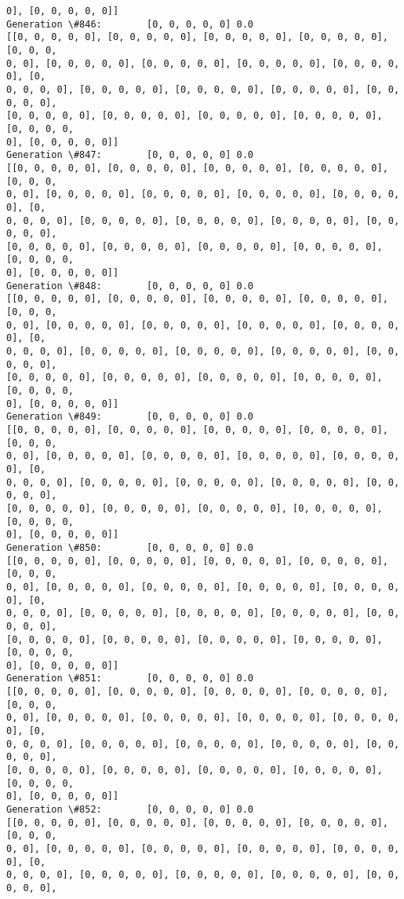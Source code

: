 \documentclass[11pt]{article}
\begin{document}
\begin{Verbatim}[commandchars=\\\{\}]
0], [0, 0, 0, 0, 0]]
Generation \#846:        [0, 0, 0, 0, 0] 0.0
[[0, 0, 0, 0, 0], [0, 0, 0, 0, 0], [0, 0, 0, 0, 0], [0, 0, 0, 0, 0], [0, 0, 0,
0, 0], [0, 0, 0, 0, 0], [0, 0, 0, 0, 0], [0, 0, 0, 0, 0], [0, 0, 0, 0, 0], [0,
0, 0, 0, 0], [0, 0, 0, 0, 0], [0, 0, 0, 0, 0], [0, 0, 0, 0, 0], [0, 0, 0, 0, 0],
[0, 0, 0, 0, 0], [0, 0, 0, 0, 0], [0, 0, 0, 0, 0], [0, 0, 0, 0, 0], [0, 0, 0, 0,
0], [0, 0, 0, 0, 0]]
Generation \#847:        [0, 0, 0, 0, 0] 0.0
[[0, 0, 0, 0, 0], [0, 0, 0, 0, 0], [0, 0, 0, 0, 0], [0, 0, 0, 0, 0], [0, 0, 0,
0, 0], [0, 0, 0, 0, 0], [0, 0, 0, 0, 0], [0, 0, 0, 0, 0], [0, 0, 0, 0, 0], [0,
0, 0, 0, 0], [0, 0, 0, 0, 0], [0, 0, 0, 0, 0], [0, 0, 0, 0, 0], [0, 0, 0, 0, 0],
[0, 0, 0, 0, 0], [0, 0, 0, 0, 0], [0, 0, 0, 0, 0], [0, 0, 0, 0, 0], [0, 0, 0, 0,
0], [0, 0, 0, 0, 0]]
Generation \#848:        [0, 0, 0, 0, 0] 0.0
[[0, 0, 0, 0, 0], [0, 0, 0, 0, 0], [0, 0, 0, 0, 0], [0, 0, 0, 0, 0], [0, 0, 0,
0, 0], [0, 0, 0, 0, 0], [0, 0, 0, 0, 0], [0, 0, 0, 0, 0], [0, 0, 0, 0, 0], [0,
0, 0, 0, 0], [0, 0, 0, 0, 0], [0, 0, 0, 0, 0], [0, 0, 0, 0, 0], [0, 0, 0, 0, 0],
[0, 0, 0, 0, 0], [0, 0, 0, 0, 0], [0, 0, 0, 0, 0], [0, 0, 0, 0, 0], [0, 0, 0, 0,
0], [0, 0, 0, 0, 0]]
Generation \#849:        [0, 0, 0, 0, 0] 0.0
[[0, 0, 0, 0, 0], [0, 0, 0, 0, 0], [0, 0, 0, 0, 0], [0, 0, 0, 0, 0], [0, 0, 0,
0, 0], [0, 0, 0, 0, 0], [0, 0, 0, 0, 0], [0, 0, 0, 0, 0], [0, 0, 0, 0, 0], [0,
0, 0, 0, 0], [0, 0, 0, 0, 0], [0, 0, 0, 0, 0], [0, 0, 0, 0, 0], [0, 0, 0, 0, 0],
[0, 0, 0, 0, 0], [0, 0, 0, 0, 0], [0, 0, 0, 0, 0], [0, 0, 0, 0, 0], [0, 0, 0, 0,
0], [0, 0, 0, 0, 0]]
Generation \#850:        [0, 0, 0, 0, 0] 0.0
[[0, 0, 0, 0, 0], [0, 0, 0, 0, 0], [0, 0, 0, 0, 0], [0, 0, 0, 0, 0], [0, 0, 0,
0, 0], [0, 0, 0, 0, 0], [0, 0, 0, 0, 0], [0, 0, 0, 0, 0], [0, 0, 0, 0, 0], [0,
0, 0, 0, 0], [0, 0, 0, 0, 0], [0, 0, 0, 0, 0], [0, 0, 0, 0, 0], [0, 0, 0, 0, 0],
[0, 0, 0, 0, 0], [0, 0, 0, 0, 0], [0, 0, 0, 0, 0], [0, 0, 0, 0, 0], [0, 0, 0, 0,
0], [0, 0, 0, 0, 0]]
Generation \#851:        [0, 0, 0, 0, 0] 0.0
[[0, 0, 0, 0, 0], [0, 0, 0, 0, 0], [0, 0, 0, 0, 0], [0, 0, 0, 0, 0], [0, 0, 0,
0, 0], [0, 0, 0, 0, 0], [0, 0, 0, 0, 0], [0, 0, 0, 0, 0], [0, 0, 0, 0, 0], [0,
0, 0, 0, 0], [0, 0, 0, 0, 0], [0, 0, 0, 0, 0], [0, 0, 0, 0, 0], [0, 0, 0, 0, 0],
[0, 0, 0, 0, 0], [0, 0, 0, 0, 0], [0, 0, 0, 0, 0], [0, 0, 0, 0, 0], [0, 0, 0, 0,
0], [0, 0, 0, 0, 0]]
Generation \#852:        [0, 0, 0, 0, 0] 0.0
[[0, 0, 0, 0, 0], [0, 0, 0, 0, 0], [0, 0, 0, 0, 0], [0, 0, 0, 0, 0], [0, 0, 0,
0, 0], [0, 0, 0, 0, 0], [0, 0, 0, 0, 0], [0, 0, 0, 0, 0], [0, 0, 0, 0, 0], [0,
0, 0, 0, 0], [0, 0, 0, 0, 0], [0, 0, 0, 0, 0], [0, 0, 0, 0, 0], [0, 0, 0, 0, 0],

\end{Verbatim}
\end{document}
